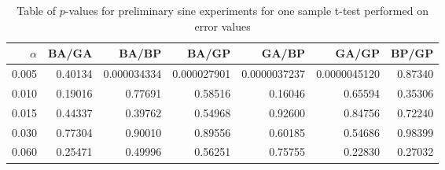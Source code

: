 \documentclass[a4paper,11pt]{article}
\begin{document}
\begin{appendices}
\begin{table}[htb]
\caption{Table of $p$-values for preliminary sine experiments for one sample t-test performed on error values} 
\begin{center}
\begin{tabular}{r|rrrrrr}
 $\alpha$  &    BA/GA  &        BA/BP  &        BA/GP  &         GA/BP  &         GA/GP  &    BP/GP  \\
\hline
    0.005  &  0.40134  &  0.000034334  &  0.000027901  &  0.0000037237  &  0.0000045120  &  0.87340  \\
    0.010  &  0.19016  &      0.77691  &      0.58516  &       0.16046  &       0.65594  &  0.35306  \\
    0.015  &  0.44337  &      0.39762  &      0.54968  &       0.92600  &       0.84756  &  0.72240  \\
    0.030  &  0.77304  &      0.90010  &      0.89556  &       0.60185  &       0.54686  &  0.98399  \\
    0.060  &  0.25471  &      0.49996  &      0.56251  &       0.75755  &       0.22830  &  0.27032  \\
\end{tabular}
\end{center}
\end{table}



\end{appendices}
\end{document}
